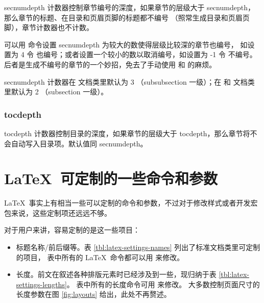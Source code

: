 secnumdepth 计数器控制章节编号的深度，如果章节的层级大于 secnumdepth，那么章节的标题、在目录和页眉页脚的标题都不编号
（照常生成目录和页眉页脚），章节计数器也不计数。

可以用  命令设置 secnumdepth 为较大的数使得层级比较深的章节也编号，
如设置为 4 令  也编号；或者设置一个较小的数以取消编号，如设置为 -1 令  不编号。
后者是生成不编号的章节的一个妙招，免去了手动使用  和  的麻烦。

secnumdepth 计数器在  文档类里默认为 3 （subsubsection 一级）；在  和  文档类里默认为 2 （subsection 一级）。

\subsubsection{tocdepth}

tocdepth 计数器控制目录的深度，如果章节的层级大于 tocdepth，那么章节将不会自动写入目录项。默认值同 secnumdepth。

\section{\LaTeX\ 可定制的一些命令和参数}\label{sec:latex-settings}

\LaTeX\ 事实上有相当一些可以定制的命令和参数，不过对于修改样式或者开发宏包来说，这些定制项还远远不够。

对于用户来讲，容易定制的是这一些项目：

\begin{itemize}
  \item 标题名称/前后缀等。表 \ref{tbl:latex-settings-names} 列出了标准文档类里可定制的项目，
  表中所有的 \LaTeX\ 命令都可以用  来修改。
  \item 长度。前文在叙述各种排版元素时已经涉及到一些，现归纳于表 \ref{tbl:latex-settings-lengths}。
  表中所有的长度命令可用  来修改。
  大多数控制页面尺寸的长度参数在图 \ref{fig:layouts} 给出，此处不再赘述。
\end{itemize}

